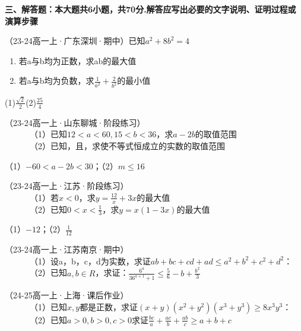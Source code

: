 \documentclass[11pt,a4paper]{ctexbook}
\begin{document}
\textbf{三、解答题：本大题共6小题，共70分.解答应写出必要的文字说明、证明过程或演算步骤}
\begin{hmwk}
    （23-24高一上·广东深圳·期中）已知$a^2+8b^2=4$
    \begin{enumerate}
        \item 若a与b均为正数，求ab的最大值
        \item 若a与b均为负数，求$\displaystyle \frac{1}{a^2}+\frac{2}{b^2}$的最小值
    \end{enumerate}
    \begin{jiexi}
        (1)$\displaystyle \frac{\sqrt{2}}{2}$\quad(2)$\displaystyle \frac{25}{4}$
    \end{jiexi}
\end{hmwk}

\begin{hmwk}
    （23-24高一上·山东聊城·阶段练习）\\
          （1）已知$12<a<60,15<b<36$，求$a-2b$的取值范围\\
          （2）已知，且，求使不等式恒成立的实数的取值范围
    \begin{jiexi}
        （1）$-60<a-2b<30$；（2）$m\le16$
    \end{jiexi}
\end{hmwk}

\begin{hmwk}
    （23-24高一上·江苏·阶段练习）\\
          （1）若$x<0$，求$\displaystyle y=\frac{12}{x}+3x$的最大值 \\
          （2）已知$\displaystyle 0<x<\frac{1}{3}$，求$y=x(1-3x)$的最大值
    \begin{jiexi}
        （1）$-12$；（2）$\frac{1}{12}$
    \end{jiexi}
\end{hmwk}

\begin{hmwk}
    （23-24高一上·江苏南京·期中）\\
          （1）设a，b，c，d为实数，求证$ab+bc+cd+ad \le a^2+b^2+c^2+d^2$： \\
          （2）已知$a,b\in R$，求证：$\displaystyle \frac{6^a}{36^{a+1}+1}\le \frac{5}{6}-b+\frac{b^2}{3}$
\end{hmwk}

\begin{hmwk}
    （24-25高一上·上海·课后作业）\\
          （1）已知$x,y$都是正数，求证$(x+y)(x^2+y^2)(x^3+y^3)\ge8x^3y^3$： \\
          （2）已知$a>0,b>0,c>0$求证$\displaystyle \frac{bc}{a}+\frac{ac}{b}+\frac{ab}{c}\ge a+b+c$
\end{hmwk}
\end{document}
